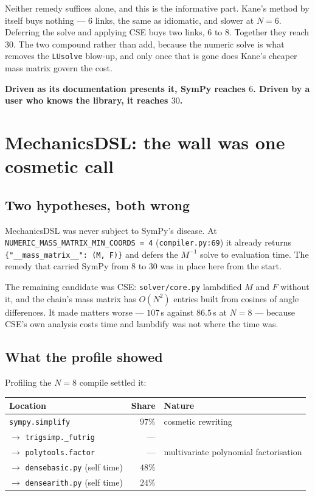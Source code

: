 \documentclass[11pt,a4paper]{article}
\newcommand{\code}[1]{\texttt{\small #1}}
\begin{document}
\noindent Neither remedy suffices alone, and this is the informative part.
Kane's method by itself buys nothing --- $6$ links, the same as idiomatic, and
slower at $N=6$. Deferring the solve and applying CSE buys two links, $6$ to
$8$. Together they reach $30$. The two compound rather than add, because the
numeric solve is what removes the \code{LUsolve} blow-up, and only once that is
gone does Kane's cheaper mass matrix govern the cost.

\textbf{Driven as its documentation presents it, SymPy reaches $6$. Driven by a
user who knows the library, it reaches $30$.}

\section{MechanicsDSL: the wall was one cosmetic call}

\subsection{Two hypotheses, both wrong}
MechanicsDSL was never subject to SymPy's disease. At
\code{NUMERIC\_MASS\_MATRIX\_MIN\_COORDS = 4} (\code{compiler.py:69}) it already
returns \code{\{"\_\_mass\_matrix\_\_": (M, F)\}} and defers the $M^{-1}$ solve
to evaluation time. The remedy that carried SymPy from $8$ to $30$ was in place
here from the start.

The remaining candidate was CSE: \code{solver/core.py} lambdified $M$ and $F$
without it, and the chain's mass matrix has $O(N^2)$ entries built from cosines
of angle differences. It made matters worse --- $107$\,s against $86.5$\,s at
$N=8$ --- because CSE's own analysis costs time and lambdify was not where the
time was.

\subsection{What the profile showed}
Profiling the $N=8$ compile settled it:

\begin{center}
\begin{tabular}{@{}lrl@{}}
\toprule
\textbf{Location} & \textbf{Share} & \textbf{Nature} \\
\midrule
\code{sympy.simplify} & $97\%$ & cosmetic rewriting \\
\quad $\to$ \code{trigsimp.\_futrig} & --- & \\
\quad $\to$ \code{polytools.factor} & --- & multivariate polynomial factorisation \\
\quad $\to$ \code{densebasic.py} (self time) & $48\%$ & \\
\quad $\to$ \code{densearith.py} (self time) & $24\%$ & \\
\bottomrule
\end{tabular}
\end{center}
\end{document}

